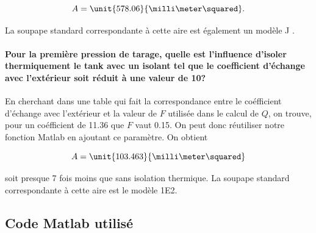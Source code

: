$$A = \unit{578.06}{\milli\meter\squared}.$$

La soupape standard correspondante à cette aire est également
un modèle J \cite{mignon}.

\paragraph{Pour la première pression de tarage, quelle est l'influence
d'isoler thermiquement le tank avec un isolant tel que le coefficient
d'échange avec l'extérieur soit réduit à une valeur de
\unit{10}{\watt\per\meter\squared\kelvin}?}
En cherchant dans une table qui fait la correspondance 
entre le coéfficient d'échange avec l'extérieur et la valeur
de $F$ utilisée dans le calcul de $Q$, on trouve, pour un
coéfficient de 11.36 que $F$ vaut 0.15. On peut donc
réutiliser notre fonction Matlab en ajoutant ce paramètre.
On obtient 

$$A = \unit{103.463}{\milli\meter\squared}$$

soit presque 7 fois moins que sans isolation thermique.
La soupape standard correspondante à cette aire est le modèle
1E2.

\annexe
\subsection{Code Matlab utilisé}
\label{code-matlab}


